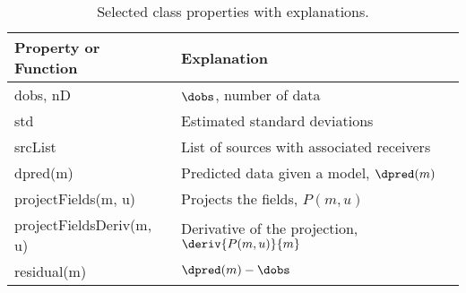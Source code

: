 \begin{table}[ht]
\caption{Selected \Survey class properties with explanations.}
\label{table:Survey}
  \begin{tabular}{  p{3.5cm}  p{10cm} }
    \hline

    Property or Function  & Explanation \\ \hline

    dobs, nD                 & $\dobs$, number of data\\
    std                      & Estimated standard deviations\\
    srcList                   & List of sources with associated receivers\\
    dpred(m)                 & Predicted data given a model, $\dpred(m)$\\
    projectFields(m, u)      & Projects the fields, $P(m,u)$\\
    projectFieldsDeriv(m, u) & Derivative of the projection, $\deriv{P(m,u)}{m}$\\
    residual(m)              & $\dpred(m) - \dobs$\\

    \hline
  \end{tabular}
\end{table}
